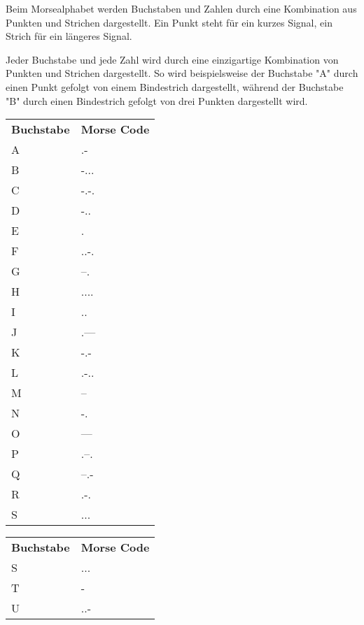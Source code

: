 \documentclass[12pt]{article}
\begin{document}
Beim Morsealphabet werden Buchstaben und Zahlen durch eine Kombination aus Punkten und Strichen dargestellt. 
Ein Punkt steht für ein kurzes Signal, ein Strich für ein längeres Signal.

Jeder Buchstabe und jede Zahl wird durch eine einzigartige Kombination von Punkten und Strichen dargestellt.
So wird beispielsweise der Buchstabe "A" durch einen Punkt gefolgt von einem Bindestrich dargestellt, während der Buchstabe "B" durch einen Bindestrich gefolgt von drei Punkten dargestellt wird.


\begin{table}[!htb]
    \begin{minipage}{.5\linewidth}
      \centering
        \begin{tabular}{ll}
            \textbf{Buchstabe} & \textbf{Morse Code} \\
            A & .- \\
            B & -... \\
            C & -.-. \\
            D & -.. \\
            E & . \\
            F & ..-. \\
            G & --. \\
            H & .... \\
            I & .. \\
            J & .--- \\
            K & -.- \\
            L & .-.. \\
            M & -- \\
            N & -. \\
            O & --- \\
            P & .--. \\
            Q & --.- \\
            R & .-. \\
            S & ... \\
        \end{tabular}
    \end{minipage}%
    \begin{minipage}{.5\linewidth}
      \centering
        \begin{tabular}{ll}
            \textbf{Buchstabe} & \textbf{Morse Code} \\
            S & ... \\
            T & - \\
            U & ..- \\

\end{tabular}
\end{minipage}
\end{table}
\end{document}
